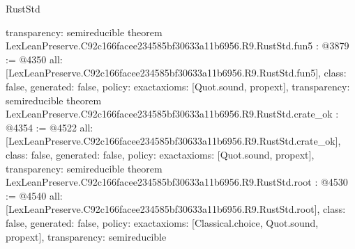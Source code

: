 \begin{lexlean}{RustStd}
\begin{coremodule}
{  transparency: semireducible
}
theorem LexLeanPreserve.C92c166facee234585bf30633a11b6956.R9.RustStd.fun5 : @3879 := @4350 {
  all: [LexLeanPreserve.C92c166facee234585bf30633a11b6956.R9.RustStd.fun5],
  class: false,
  generated: false,
  policy: exact{axioms: [Quot.sound, propext]},
  transparency: semireducible
}
theorem LexLeanPreserve.C92c166facee234585bf30633a11b6956.R9.RustStd.crate_ok : @4354 := @4522 {
  all: [LexLeanPreserve.C92c166facee234585bf30633a11b6956.R9.RustStd.crate_ok],
  class: false,
  generated: false,
  policy: exact{axioms: [Quot.sound, propext]},
  transparency: semireducible
}
theorem LexLeanPreserve.C92c166facee234585bf30633a11b6956.R9.RustStd.root : @4530 := @4540 {
  all: [LexLeanPreserve.C92c166facee234585bf30633a11b6956.R9.RustStd.root],
  class: false,
  generated: false,
  policy: exact{axioms: [Classical.choice, Quot.sound, propext]},
  transparency: semireducible
}


\end{coremodule}
\end{lexlean}
